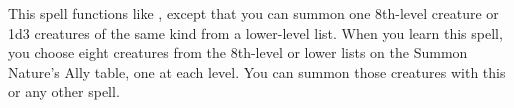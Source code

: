 \begin{spelleffect}
  This spell functions like , except that you can summon one 8th-level creature or 1d3 creatures of the same kind from a lower-level list. When you learn this spell, you choose eight creatures from the 8th-level or lower lists on the Summon Nature's Ally table, one at each level. You can summon those creatures with this or any other  spell.
\end{spelleffect}

